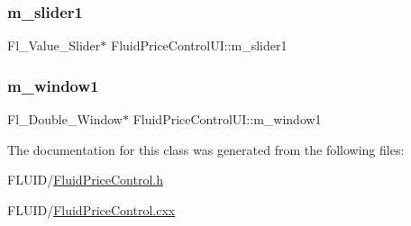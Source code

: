 \subsubsection{\texorpdfstring{m\+\_\+slider1}{m\_slider1}}
{\footnotesize\ttfamily Fl\+\_\+\+Value\+\_\+\+Slider$\ast$ Fluid\+Price\+Control\+U\+I\+::m\+\_\+slider1}

\mbox{\label{class_fluid_price_control_u_i_a65c8356043b3a182a177cf4a52317124}} 
\subsubsection{\texorpdfstring{m\+\_\+window1}{m\_window1}}
{\footnotesize\ttfamily Fl\+\_\+\+Double\+\_\+\+Window$\ast$ Fluid\+Price\+Control\+U\+I\+::m\+\_\+window1}



The documentation for this class was generated from the following files\+:\begin{DoxyCompactItemize}
\item 
F\+L\+U\+I\+D/\hyperlink{_fluid_price_control_8h}{Fluid\+Price\+Control.\+h}\item 
F\+L\+U\+I\+D/\hyperlink{_fluid_price_control_8cxx}{Fluid\+Price\+Control.\+cxx}\end{DoxyCompactItemize}
